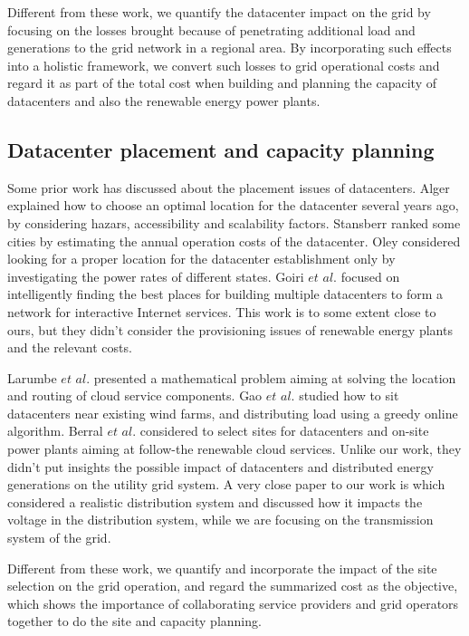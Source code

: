 Different from these work, we quantify the datacenter impact on the grid by focusing on the losses brought because of penetrating additional load and generations to the grid network in a regional area. By incorporating such effects into a holistic framework, we convert such losses to grid operational costs and regard it as part of the total cost when building and planning the capacity of datacenters and also the renewable energy power plants.

\subsection{Datacenter placement and capacity planning}

Some prior work has discussed about the placement issues of datacenters. Alger \cite{Dalger05} explained how to choose an optimal location for the datacenter several years ago, by considering hazars, accessibility and scalability factors. Stansberr \cite{Stansberr06} ranked some cities by estimating the annual operation costs of the datacenter. Oley \cite{Boley09} considered looking for a proper location for the datacenter establishment only by investigating the power rates of different states.
Goiri $\textit{et al.}$ \cite{Goiri11place} focused on intelligently finding the best places for building multiple datacenters to form a network for interactive Internet services. This work is to some extent close to ours, but they didn't consider the provisioning issues of renewable energy plants and the relevant costs.

Larumbe $\textit{et al.}$ \cite{larumbe2012optimal} presented a mathematical problem aiming at solving the location and routing of cloud service components. Gao $\textit{et al.}$ \cite{gao2013answer} studied how to sit datacenters near existing wind farms, and distributing load using a greedy online algorithm.
Berral $\textit{et al.}$ \cite{berral2014building} considered to select sites for datacenters and on-site power plants aiming at follow-the renewable cloud services. Unlike our work, they didn't put insights the possible impact of datacenters and distributed energy generations on the utility grid system.
A very close paper to our work is \cite{liu2014pricing} which considered a realistic distribution system and discussed how it impacts the voltage in the distribution system, while we are focusing on the transmission system of the grid.

Different from these work, we quantify and incorporate the impact of the site selection on the grid operation, and regard the summarized cost as the objective, which shows the importance of collaborating service providers and grid operators together to do the site and capacity planning.


